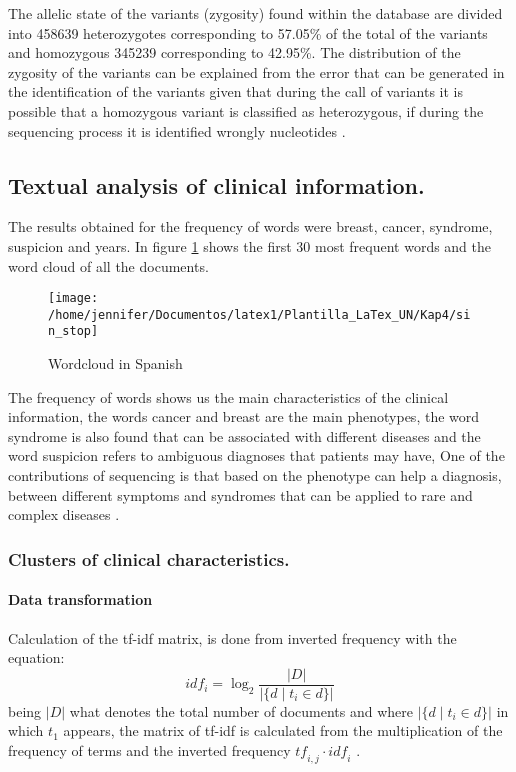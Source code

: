 \documentclass[twocolumn]{bmcart}%
\begin{document}
The allelic state of the variants (zygosity) found within the database are divided into 458639 heterozygotes corresponding to 57.05\% of the total of the variants and homozygous 345239 corresponding to 42.95\%. The distribution of the zygosity of the variants can be explained from the error that can be generated in the identification of the variants given that during the call of variants it is possible that a homozygous variant is classified as heterozygous, if during the sequencing process it is identified wrongly nucleotides \cite{Babraham2016,Pirooznia2014}.

\subsection*{Textual analysis of clinical information.}
The results obtained for the frequency of words were breast, cancer, syndrome, suspicion and years. In figure \ref{fig:sin} shows the first 30 most frequent words and the word cloud of all the documents.

\begin{figure}[h!]
	\centering
	\texttt{[image: /home/jennifer/Documentos/latex1/Plantilla\_LaTex\_UN/Kap4/sin\_stop]}
	\caption{Wordcloud in Spanish}
	\label{fig:sin}
\end{figure}

The frequency of words shows us the main characteristics of the clinical information, the words cancer and breast are the main phenotypes, the word syndrome is also found that can be associated with different diseases and the word suspicion refers to ambiguous diagnoses that patients may have, One of the contributions of sequencing is that based on the phenotype can help a diagnosis, between different symptoms and syndromes that can be applied to rare and complex diseases \cite{Tetreault2015a}. 

\subsubsection*{Clusters of clinical characteristics.}

\paragraph*{Data transformation}
Calculation of the tf-idf matrix, is done from inverted frequency with the equation:
$${idf}_i = \log_2 \frac{|D|}{|\{d \mid t_i \in d\}|}$$
being $|D|$ what denotes the total number of documents and where $|\{d\mid t_i \in d\}|$ in which $t_1$  appears, the matrix of tf-idf is calculated from the multiplication of the frequency of terms and the inverted frequency $\mathit{tf}_{i,j} \cdot \mathit{idf}_i$ \cite{Buckley1988}.
\end{document}
